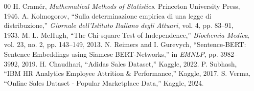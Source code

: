\documentclass[conference]{IEEEtran}
\begin{document}
\begin{thebibliography}{00}
 H. Cramér, \textit{Mathematical Methods of Statistics}. Princeton University Press, 1946.
 A. Kolmogorov, ``Sulla determinazione empirica di una legge di distribuzione,'' \textit{Giornale dell'Istituto Italiano degli Attuari}, vol. 4, pp. 83--91, 1933.
 M. L. McHugh, ``The Chi-square Test of Independence,'' \textit{Biochemia Medica}, vol. 23, no. 2, pp. 143--149, 2013.
 N. Reimers and I. Gurevych, ``Sentence-BERT: Sentence Embeddings using Siamese BERT-Networks,'' in \textit{EMNLP}, pp. 3982--3992, 2019.
 H. Chaudhari, ``Adidas Sales Dataset,'' Kaggle, 2022.
 P. Subhash, ``IBM HR Analytics Employee Attrition \& Performance,'' Kaggle, 2017.
 S. Verma, ``Online Sales Dataset - Popular Marketplace Data,'' Kaggle, 2024.
\end{thebibliography}
\end{document}
